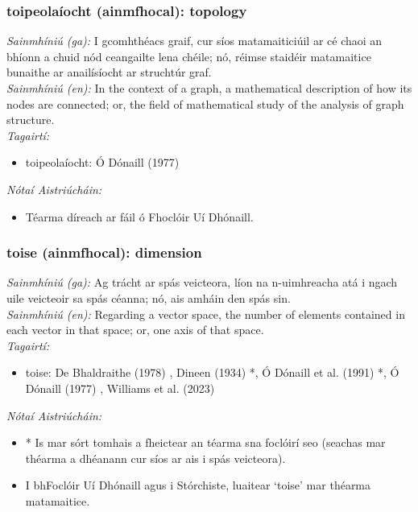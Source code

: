 \documentclass{article}
\begin{document}
\subsubsection*{toipeolaíocht (ainmfhocal): topology}
 \noindent \textit{Sainmhíniú (ga):} I gcomhthéacs graif, cur síos matamaiticiúil ar cé chaoi an bhíonn a chuid nód ceangailte lena chéile; nó, réimse staidéir matamaitice bunaithe ar anailísíocht ar struchtúr graf.
\\
 \noindent \textit{Sainmhíniú (en):} In the context of a graph, a mathematical description of how its nodes are connected; or, the field of mathematical study of the analysis of graph structure.
\\
 \noindent \textit{Tagairtí:}
\begin{itemize}
	\item toipeolaíocht: Ó Dónaill (1977) \cite{odonaill}
\end{itemize}

 \noindent \textit{Nótaí Aistriúcháin:}
\begin{itemize}
	\item Téarma díreach ar fáil ó Fhoclóir Uí Dhónaill.
\end{itemize}


\subsubsection*{toise (ainmfhocal): dimension}
 \noindent \textit{Sainmhíniú (ga):} Ag trácht ar spás veicteora, líon na n-uimhreacha atá i ngach uile veicteoir sa spás céanna; nó, ais amháin den spás sin.
\\
 \noindent \textit{Sainmhíniú (en):} Regarding a vector space, the number of elements contained in each vector in that space; or, one axis of that space.
\\
 \noindent \textit{Tagairtí:}
\begin{itemize}
	\item toise: De Bhaldraithe (1978) \cite{de-bhaldraithe}, Dineen (1934) \cite{dineen}*, Ó Dónaill et al. (1991) \cite{focloir-beag}*, Ó Dónaill (1977) \cite{odonaill}, Williams et al. (2023) \cite{storchiste}
\end{itemize}

 \noindent \textit{Nótaí Aistriúcháin:}
\begin{itemize}
	\item * Is mar sórt tomhais a fheictear an téarma sna foclóirí seo (seachas mar théarma a dhéanann cur síos ar ais i spás veicteora).
	\item I bhFoclóir Uí Dhónaill agus i Stórchiste, luaitear `toise' mar théarma matamaitice.
\end{itemize}
\end{document}
